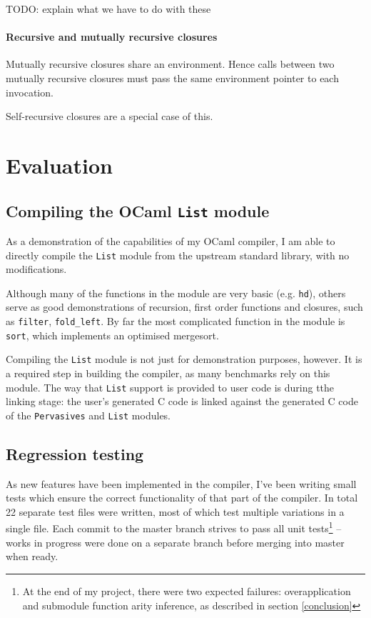\documentclass[12pt,a4paper,twoside,openright]{report}
\begin{document}
TODO: explain what we have to do with these

\subsubsection{Recursive and mutually recursive closures}

Mutually recursive closures share an environment. Hence calls between two
mutually recursive closures must pass the same environment pointer to each
invocation.

Self-recursive closures are a special case of this.



\chapter{Evaluation}

\section{Compiling the OCaml \texttt{List} module}\label{module-list}

As a demonstration of the capabilities of my OCaml compiler, I am able to
directly compile the \lstinline!List! module from the upstream standard
library, with no modifications.

Although many of the functions in the module are very basic (e.g.
\lstinline!hd!), others serve as good demonstrations of recursion, first order
functions and closures, such as \lstinline!filter!, \lstinline!fold_left!. By
far the most complicated function in the module is \lstinline!sort!, which
implements an optimised mergesort.

Compiling the \lstinline!List! module is not just for demonstration purposes,
however. It is a required step in building the compiler, as many benchmarks
rely on this module. The way that \lstinline!List! support is provided to user
code is during tthe linking stage: the user's generated C code is linked
against the generated C code of the \lstinline!Pervasives! and \lstinline!List!
modules.

\section{Regression testing}

As new features have been implemented in the compiler, I've been writing small
tests which ensure the correct functionality of that part of the compiler. In
total 22 separate test files were written, most of which test multiple
variations in a single file. Each commit to the master branch strives to pass
all unit tests\footnote{At the end of my project, there were two expected
  failures: overapplication and submodule function arity inference, as
  described in section \ref{conclusion}}
-- works in progress were done on a separate branch before merging into master
when ready.
\end{document}
